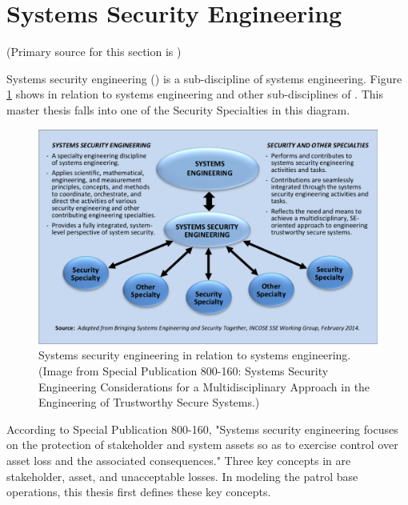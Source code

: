\documentclass[../../main/main.tex]{subfiles}
\begin{document}
\section{Systems Security Engineering}\label{sec:sse} (Primary source for this section is \cite{NIST800160})

Systems security engineering () is a sub-discipline of systems engineering.  Figure \ref{fig:nist800160} shows  in relation to systems engineering and other sub-disciplines of .  This master thesis falls into one of the Security Specialties in this diagram.

\begin{figure}[h]
\includegraphics[width=\linewidth]{../figures/seincontext.png}
\caption{\label{fig:nist800160}Systems security engineering in relation to systems engineering. (Image from  Special Publication 800-160: Systems Security Engineering Considerations for a Multidisciplinary Approach in the Engineering of Trustworthy Secure Systems.)}
\end{figure}

According to  Special Publication 800-160, "Systems security engineering focuses on the protection of stakeholder and system assets so as to exercise control over asset loss and the associated consequences."  Three key concepts in  are stakeholder, asset, and unacceptable losses.  In modeling the patrol base operations, this thesis first defines these key concepts.  
\end{document}
